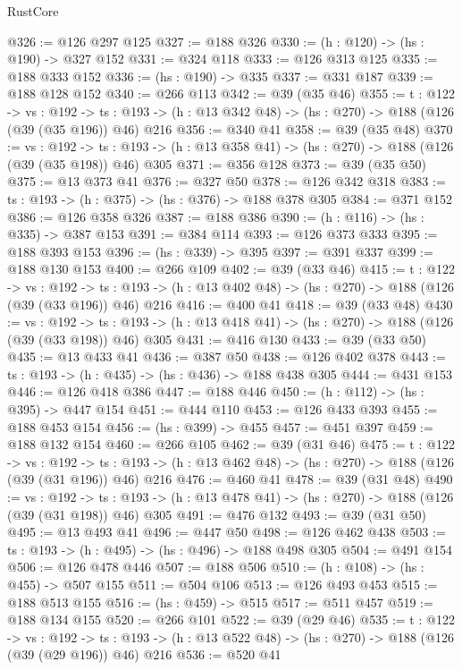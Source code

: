 \begin{lexlean}{RustCore}
\begin{coremodule}
@326 := @126 @297 @125
@327 := @188 @326
@330 := (h : @120) -> (hs : @190) -> @327 @152
@331 := @324 @118
@333 := @126 @313 @125
@335 := @188 @333 @152
@336 := (hs : @190) -> @335
@337 := @331 @187
@339 := @188 @128 @152
@340 := @266 @113
@342 := @39 (@35 @46)
@355 := {t : @122} ->
  {vs : @192} ->
  {ts : @193} -> (h : @13 @342 @48) -> (hs : @270) -> @188 (@126 (@39 (@35 @196)) @46) @216
@356 := @340 @41
@358 := @39 (@35 @48)
@370 := {vs : @192} ->
  {ts : @193} -> (h : @13 @358 @41) -> (hs : @270) -> @188 (@126 (@39 (@35 @198)) @46) @305
@371 := @356 @128
@373 := @39 (@35 @50)
@375 := @13 @373 @41
@376 := @327 @50
@378 := @126 @342 @318
@383 := {ts : @193} -> (h : @375) -> (hs : @376) -> @188 @378 @305
@384 := @371 @152
@386 := @126 @358 @326
@387 := @188 @386
@390 := (h : @116) -> (hs : @335) -> @387 @153
@391 := @384 @114
@393 := @126 @373 @333
@395 := @188 @393 @153
@396 := (hs : @339) -> @395
@397 := @391 @337
@399 := @188 @130 @153
@400 := @266 @109
@402 := @39 (@33 @46)
@415 := {t : @122} ->
  {vs : @192} ->
  {ts : @193} -> (h : @13 @402 @48) -> (hs : @270) -> @188 (@126 (@39 (@33 @196)) @46) @216
@416 := @400 @41
@418 := @39 (@33 @48)
@430 := {vs : @192} ->
  {ts : @193} -> (h : @13 @418 @41) -> (hs : @270) -> @188 (@126 (@39 (@33 @198)) @46) @305
@431 := @416 @130
@433 := @39 (@33 @50)
@435 := @13 @433 @41
@436 := @387 @50
@438 := @126 @402 @378
@443 := {ts : @193} -> (h : @435) -> (hs : @436) -> @188 @438 @305
@444 := @431 @153
@446 := @126 @418 @386
@447 := @188 @446
@450 := (h : @112) -> (hs : @395) -> @447 @154
@451 := @444 @110
@453 := @126 @433 @393
@455 := @188 @453 @154
@456 := (hs : @399) -> @455
@457 := @451 @397
@459 := @188 @132 @154
@460 := @266 @105
@462 := @39 (@31 @46)
@475 := {t : @122} ->
  {vs : @192} ->
  {ts : @193} -> (h : @13 @462 @48) -> (hs : @270) -> @188 (@126 (@39 (@31 @196)) @46) @216
@476 := @460 @41
@478 := @39 (@31 @48)
@490 := {vs : @192} ->
  {ts : @193} -> (h : @13 @478 @41) -> (hs : @270) -> @188 (@126 (@39 (@31 @198)) @46) @305
@491 := @476 @132
@493 := @39 (@31 @50)
@495 := @13 @493 @41
@496 := @447 @50
@498 := @126 @462 @438
@503 := {ts : @193} -> (h : @495) -> (hs : @496) -> @188 @498 @305
@504 := @491 @154
@506 := @126 @478 @446
@507 := @188 @506
@510 := (h : @108) -> (hs : @455) -> @507 @155
@511 := @504 @106
@513 := @126 @493 @453
@515 := @188 @513 @155
@516 := (hs : @459) -> @515
@517 := @511 @457
@519 := @188 @134 @155
@520 := @266 @101
@522 := @39 (@29 @46)
@535 := {t : @122} ->
  {vs : @192} ->
  {ts : @193} -> (h : @13 @522 @48) -> (hs : @270) -> @188 (@126 (@39 (@29 @196)) @46) @216
@536 := @520 @41

\end{coremodule}
\end{lexlean}
